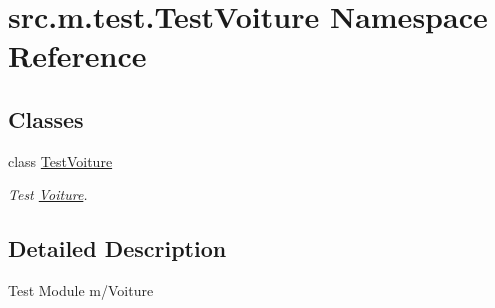 \hypertarget{namespacesrc_1_1m_1_1test_1_1_test_voiture}{}\section{src.\+m.\+test.\+Test\+Voiture Namespace Reference}
\label{namespacesrc_1_1m_1_1test_1_1_test_voiture}
\subsection*{Classes}
\begin{DoxyCompactItemize}
\item 
class \hyperlink{classsrc_1_1m_1_1test_1_1_test_voiture_1_1_test_voiture}{Test\+Voiture}
\begin{DoxyCompactList}\small\item\em Test \hyperlink{namespacesrc_1_1m_1_1_voiture}{Voiture}. \end{DoxyCompactList}\end{DoxyCompactItemize}


\subsection{Detailed Description}
\begin{DoxyVerb}    Test Module m/Voiture
\end{DoxyVerb}
 